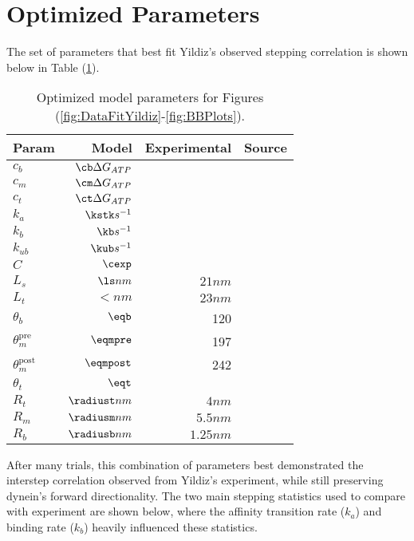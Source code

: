 \section{Optimized Parameters}\label{sec:Params}
The set of parameters that best fit Yildiz's observed stepping correlation is shown below in Table (\ref{tab:params}).

\begin{table}[H]
  \centering
  \begin{tabular}{|l | r | r | r|}
  	\hline
    Param & Model & Experimental & Source \\
    \hline
    $c_b$ & $\cb \Delta G_{ATP}$ &  & \\
    $c_m$ & $\cm \Delta G_{ATP}$ &  & \\
    $c_t$ & $\ct \Delta G_{ATP}$ &  & \\
    $k_a$ & $\kstk s^{-1}$&  & \\
    $k_b$ & $\kb s^{-1}$&  & \\
    $k_{ub}$ & $\kub s^{-1}$ & & \\
    $C$ & $\cexp$ & & \\
    $L_s$ & $\ls nm$ & $21nm$ & \cite{Burgess2003, 3vkh-cite, carter-paper}\\
    $L_t$ & $\lt nm$ & $23nm$ & \cite{Burgess2003, 3vkh-cite, carter-paper}\\
    $\theta_b$ & $\eqb$ &  120 & \cite{leschziner} \\
    $\theta_m^{\mbox{pre}}$ & $\eqmpre$ &  197 & \cite{Burgess2003}\\
    $\theta_m^{\mbox{post}}$ & $\eqmpost$ & 242 & \cite{Burgess2003}\\
    $\theta_t$ & $\eqt$ &  & \\
    $R_t$ & $\radiust nm$ & $4nm$ & \cite{Burgess2003}\\
    $R_m$ & $\radiusm nm$ & $5.5nm$ & \cite{Burgess2003}\\
    $R_b$ & $\radiusb nm$ & $1.25nm$ & \cite{Burgess2003}\\
    \hline
  \end{tabular}
  \caption{Optimized model parameters for Figures (\ref{fig:DataFitYildiz}-\ref{fig:BBPlots}).}
  \label{tab:params}
\end{table}

After many trials, this combination of parameters best demonstrated the interstep correlation observed from Yildiz's experiment, while still preserving dynein's forward directionality. The two main stepping statistics used to compare with experiment are shown below, where the affinity transition rate ($k_a$) and binding rate ($k_b$) heavily influenced these statistics.  

